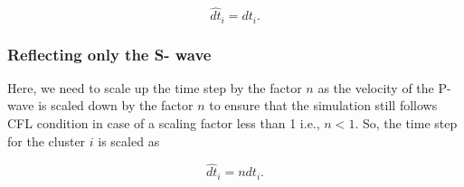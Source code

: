 \begin{equation}
    \hat{dt}_i = dt_i .
\end{equation}

\subsubsection{Reflecting only the S- wave}
Here, we need to scale up the time step by the factor $n$ as the velocity of the P- wave is scaled down by the factor $n$ to ensure that the simulation still follows
\ac{CFL} condition in case of a scaling factor less than 1 i.e., $n < 1$. So, the time step for the cluster $i$ is scaled as

\begin{equation}
    \hat{dt}_i = n dt_i .
\end{equation}